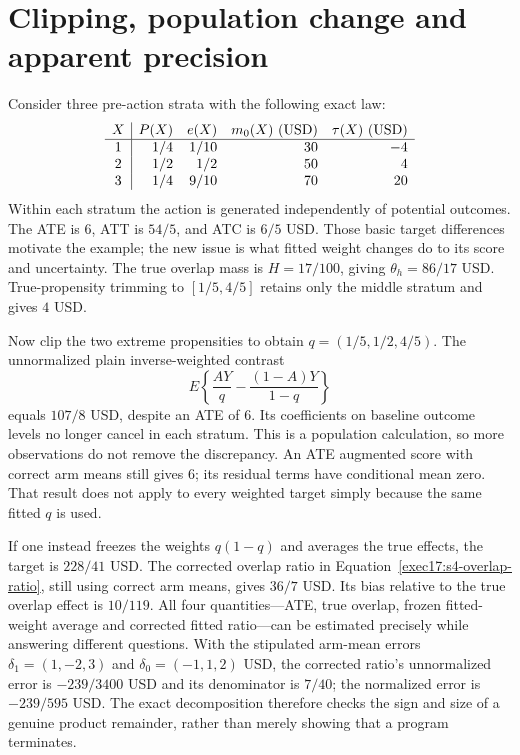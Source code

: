 \section{Clipping, population change and apparent precision}
\label{exec17:s4-clipping}

Consider three pre-action strata with the following exact law:
\[
\begin{array}{c|rrrr}
 X& P(X)&e(X)&m_0(X)\ ({\rm USD})&\tau(X)\ ({\rm USD})\\ \hline
 1&1/4&1/10&30&-4\\
 2&1/2&1/2&50&4\\
 3&1/4&9/10&70&20
\end{array}
\]
Within each stratum the action is generated independently of potential
outcomes. The ATE is $6$, ATT is $54/5$, and ATC is $6/5$ USD. Those basic
target differences motivate the example; the new issue is what fitted
weight changes do to its score and uncertainty. The true overlap mass is
$H=17/100$, giving $\theta_h=86/17$ USD. True-propensity trimming to
$[1/5,4/5]$ retains only the middle stratum and gives $4$ USD.
\citep{exec17_s4_math}

Now clip the two extreme propensities to obtain
$q=(1/5,1/2,4/5)$. The unnormalized plain inverse-weighted contrast
\[
 E\left\{\frac{AY}{q}-\frac{(1-A)Y}{1-q}\right\}
\]
equals $107/8$ USD, despite an ATE of $6$. Its coefficients on baseline
outcome levels no longer cancel in each stratum. This is a population
calculation, so more observations do not remove the discrepancy. An ATE
augmented score with correct arm means still gives $6$; its residual terms
have conditional mean zero. That result does not apply to every weighted
target simply because the same fitted $q$ is used.

If one instead freezes the weights $q(1-q)$ and averages the true effects,
the target is $228/41$ USD. The corrected overlap ratio in
Equation~\eqref{exec17:s4-overlap-ratio}, still using correct arm means,
gives $36/7$ USD. Its bias relative to the true overlap effect is $10/119$.
All four quantities---ATE, true overlap, frozen fitted-weight average and
corrected fitted ratio---can be estimated precisely while answering different
questions. With the stipulated arm-mean errors
$\delta_1=(1,-2,3)$ and $\delta_0=(-1,1,2)$ USD, the corrected ratio's
unnormalized error is $-239/3400$ USD and its denominator is $7/40$;
the normalized error is $-239/595$ USD. The exact decomposition therefore
checks the sign and size of a genuine product remainder, rather than merely
showing that a program terminates.~\citep{exec17_s4_math}

